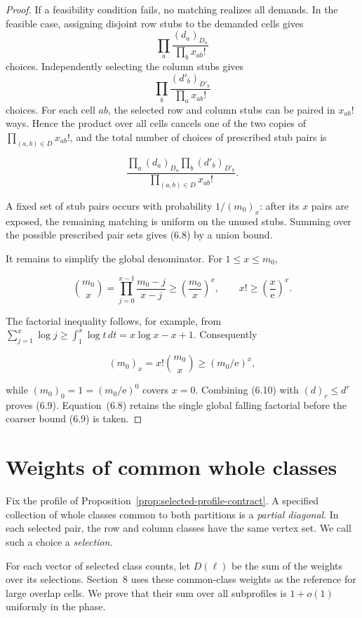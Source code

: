 \documentclass[a4paper,10pt,reqno]{amsart}
\numberwithin{equation}{section}
\theoremstyle{plain}
\theoremstyle{remark}
\begin{document}
\begin{proof}
If a feasibility condition fails, no matching realizes all demands. In the
feasible case, assigning disjoint row stubs to the demanded cells gives
\[
  \prod_a\frac{(d_a)_{D_a}}{\prod_b x_{ab}!}
\]
choices. Independently selecting the column stubs gives
\[
  \prod_b\frac{(d'_b)_{D'_b}}{\prod_a x_{ab}!}
\]
choices. For each cell \(ab\), the selected row and column stubs can be paired
in \(x_{ab}!\) ways. Hence the product over all cells cancels one of the two
copies of \(\prod_{(a,b)\in D}x_{ab}!\), and the total number of choices of prescribed stub pairs
is

\[
 \frac{\prod_a(d_a)_{D_a}\prod_b(d'_b)_{D'_b}}
      {\prod_{(a,b)\in D}x_{ab}!}.
\]

A fixed set of stub pairs occurs with probability \(1/(m_0)_x\): after
its \(x\) pairs are exposed, the remaining matching is uniform on the unused
stubs. Summing over the possible prescribed pair sets gives (6.8) by a
union bound.

It remains to simplify the global denominator.  For \(1\le x\le m_0\),

\[
 \binom{m_0}{x}
 =\prod_{j=0}^{x-1}\frac{m_0-j}{x-j}
 \ge\left(\frac{m_0}{x}\right)^x,
 \qquad
 x!\ge\left(\frac{x}{\mathrm{e}}\right)^x.
\]

The factorial inequality follows, for example, from
\(\sum_{j=1}^x\log j\ge\int_1^x\log t\,dt=x\log x-x+1\).
Consequently

\[
 (m_0)_x=x!\binom{m_0}{x}\ge(m_0/\mathrm{e})^x,          \tag{6.10}
\]

while \((m_0)_0=1=(m_0/\mathrm e)^0\) covers \(x=0\). Combining (6.10) with
\((d)_r\le d^r\) proves (6.9). Equation~(6.8) retains the single global falling
factorial before the coarser bound (6.9) is taken.
\end{proof}

\section{Weights of common whole classes}\label{exact-partial-diagonals}

Fix the profile of Proposition~\ref{prop:selected-profile-contract}.
A specified collection of whole classes common to both partitions is a
\emph{partial diagonal}. In each selected pair, the row and column classes
have the same vertex set. We call such a choice a \emph{selection}.

For each vector of selected class counts, let $D(\ell)$ be the sum of the
weights over its selections. Section~8 uses these common-class weights
as the reference for large overlap cells. We prove that their sum over all
subprofiles is $1+o(1)$ uniformly in the phase.
\end{document}
